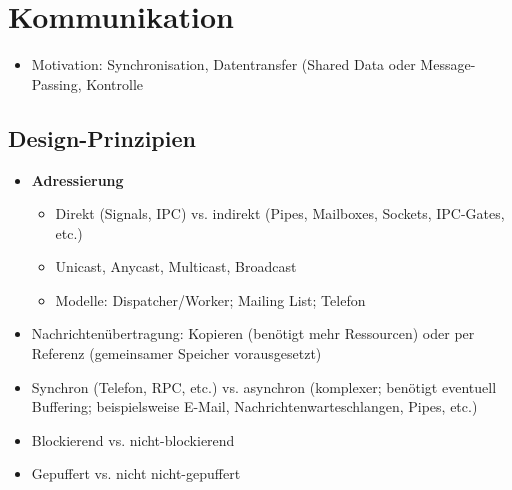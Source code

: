 \section{Kommunikation}
\begin{itemize}
	\item Motivation: Synchronisation, Datentransfer (Shared Data oder Message-Passing, Kontrolle
\end{itemize}

\subsection{Design-Prinzipien}
\begin{itemize}
	\item \textbf{Adressierung}
	\begin{itemize}
		\item Direkt (Signals, IPC) vs. indirekt (Pipes, Mailboxes, Sockets, IPC-Gates, etc.)
		\item Unicast, Anycast, Multicast, Broadcast
		\item Modelle: Dispatcher/Worker; Mailing List; Telefon
	\end{itemize}
	\item Nachrichtenübertragung: Kopieren (benötigt mehr Ressourcen) oder per Referenz (gemeinsamer Speicher vorausgesetzt)
	\item Synchron (Telefon, RPC, etc.) vs. asynchron (komplexer; benötigt eventuell Buffering; beispielsweise E-Mail, Nachrichtenwarteschlangen, Pipes, etc.)
	\item Blockierend vs. nicht-blockierend
	\item Gepuffert vs. nicht nicht-gepuffert
\end{itemize}


